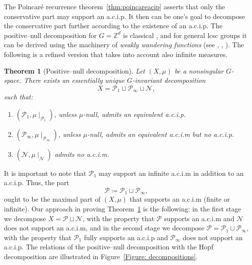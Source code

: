 \documentclass{amsart}
\numberwithin{equation}{subsection}
\newtheorem{thm}{Theorem}[section]
\begin{document}
The Poincar\'{e} recurrence theorem~\ref{thm:poincareacip} asserts that only the conservative part may support an {\sc a.c.i.p}. It then can be one's goal to decompose the conservative part further according to the existence of an {\sc a.c.i.p}. The positive--null decomposition for \(G=\mathbb{Z}^{d}\) is classical \cite[\S3.4, Theorem 4.6, \S6.3, Theorem 3.9]{krengel1985ergodic}, and for general lcsc groups it can be derived using the machinery of {\it weakly wandering functions} (see \cite[\S3.4; \S3.5 Theorem 4.9; \S6.3 Theorem 3.10]{krengel1985ergodic}, \cite{grabarnik1995singular}, \cite[\S4]{avraham2023symmetric}). The following is a refined version that takes into account also infinite measures.

\begin{thm}[Positive--null decomposition]
\label{mthm:posnulldeco}
Let \(\left(X,\mu\right)\) be a nonsingular \(G\)-space. There exists an essentially unique \(G\)-invariant decomposition
\[X=\mathcal{P}_{1}\sqcup\mathcal{P}_{\infty}\sqcup\mathcal{N},\]
such that:
\begin{enumerate}
    \item \(\left(\mathcal{P}_{1},\mu\mid_{\mathcal{P}_{1}}\right)\), unless \(\mu\)-null, admits an equivalent {\sc a.c.i.p}.
    \item \(\left(\mathcal{P}_{\infty},\mu\mid_{\mathcal{P}_{\infty}}\right)\), unless \(\mu\)-null, admits an equivalent {\sc a.c.i.m} but no {\sc a.c.i.p}.
    \item \(\left(\mathcal{N},\mu\mid_{\mathcal{N}}\right)\) admits no {\sc a.c.i.m}.
\end{enumerate}
\end{thm}

It is important to note that \(\mathcal{P}_{1}\) may support an infinite {\sc a.c.i.m} in addition to an {\sc a.c.i.p}. Thus, the part
\[\mathcal{P}\coloneqq \mathcal{P}_{1}\sqcup\mathcal{P}_{\infty},\]
ought to be the maximal part of \(\left(X,\mu\right)\) that supports an {\sc a.c.i.m} (finite or infinite). Our approach in proving Theorem~\ref{mthm:posnulldeco} is the following: in the first stage we decompose \(X=\mathcal{P}\sqcup\mathcal{N}\), with the property that \(\mathcal{P}\) supports an {\sc a.c.i.m} and \(\mathcal{N}\) does not support an {\sc a.c.i.m}, and in the second stage we decompose \(\mathcal{P}=\mathcal{P}_{1}\sqcup\mathcal{P}_{\infty}\), with the property that \(\mathcal{P}_{1}\) fully supports an {\sc a.c.i.p} and \(\mathcal{P}_{\infty}\) does not support an {\sc a.c.i.p}. The relations of the positive--null decomposition with the Hopf decomposition are illustrated in Figure~\ref{Figure: decompositions}.
\end{document}
